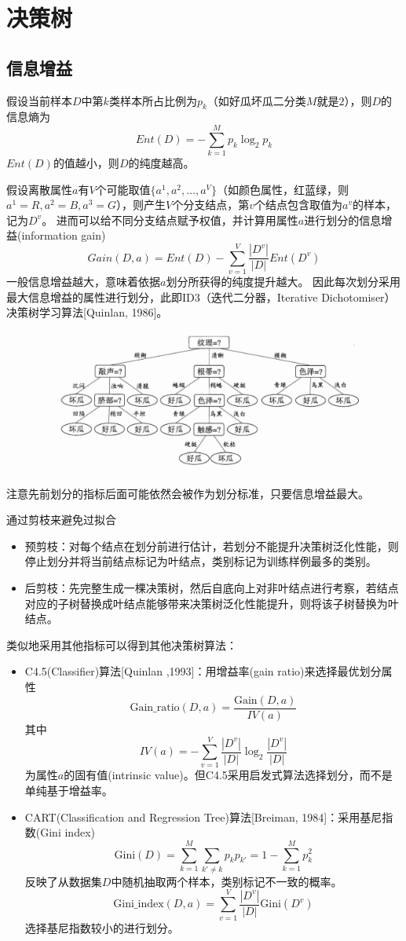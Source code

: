 
\section{决策树}
\subsection{信息增益}
假设当前样本$D$中第$k$类样本所占比例为$p_k$（如好瓜坏瓜二分类$M$就是$2$），则$D$的信息熵为
\[Ent(D)=-\sum_{k=1}^M p_k\log_2 p_k\]
$Ent(D)$的值越小，则$D$的纯度越高。

假设离散属性$a$有$V$个可能取值$\{a^1,a^2,\ldots,a^V\}$（如颜色属性，红蓝绿，则$a^1=R,a^2=B,a^3=G$），则产生$V$个分支结点，第$v$个结点包含取值为$a^v$的样本，记为$D^v$。
进而可以给不同分支结点赋予权值，并计算用属性$a$进行划分的信息增益(information gain)
\[Gain(D,a)=Ent(D)-\sum_{v=1}^V\frac{|D^v|}{|D|}Ent(D^v)\]
一般信息增益越大，意味着依据$a$划分所获得的纯度提升越大。
因此每次划分采用最大信息增益的属性进行划分，此即ID3（迭代二分器，Iterative Dichotomiser）决策树学习算法[Quinlan, 1986]。
\begin{figure}[H]
\centering
\includegraphics[width=0.6\linewidth]{fig/ID3.png}
\end{figure}

注意先前划分的指标后面可能依然会被作为划分标准，只要信息增益最大。

通过剪枝来避免过拟合
\begin{itemize}
	\item 预剪枝：对每个结点在划分前进行估计，若划分不能提升决策树泛化性能，则停止划分并将当前结点标记为叶结点，类别标记为训练样例最多的类别。
	\item 后剪枝：先完整生成一棵决策树，然后自底向上对非叶结点进行考察，若结点对应的子树替换成叶结点能够带来决策树泛化性能提升，则将该子树替换为叶结点。
\end{itemize}

类似地采用其他指标可以得到其他决策树算法：
\begin{itemize}
	\item C4.5(Classifier)算法[Quinlan ,1993]：用增益率(gain ratio)来选择最优划分属性
	\[\text{Gain\_ratio}(D,a)=\frac{\text{Gain}(D,a)}{IV(a)}\]
	其中
	\[IV(a)=-\sum_{v=1}^V\frac{|D^v|}{|D|}\log_2\frac{|D^v|}{|D|}\]
	为属性$a$的固有值(intrinsic value)。但C4.5采用启发式算法选择划分，而不是单纯基于增益率。
	\item CART(Classification and Regression Tree)算法[Breiman, 1984]：采用基尼指数(Gini index)
	\[\text{Gini}(D)=\sum_{k=1}^{M}\sum_{k'\ne k}p_kp_{k'}=1-\sum_{k=1}^Mp_k^2\]
	反映了从数据集$D$中随机抽取两个样本，类别标记不一致的概率。
	\[\text{Gini\_index}(D,a)=\sum_{v=1}^V\frac{|D^v|}{|D|}\text{Gini}(D^v)\]
	选择基尼指数较小的进行划分。
\end{itemize}

